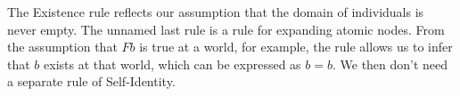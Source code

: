 
\bigskip

The Existence rule reflects our assumption that the domain of individuals is
never empty. The unnamed last rule is a rule for expanding atomic nodes. From the
assumption that $Fb$ is true at a world, for example, the rule allows us to
infer that $b$ exists at that world, which can be expressed as $b\!=\!b$. We
then don't need a separate rule of Self-Identity.

%
%

